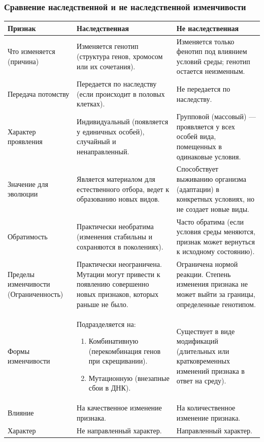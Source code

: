 \documentclass[12pt]{article}
\begin{document}
	\subsubsection{Сравнение наследственной и не наследственной изменчивости}
	\begin{xltabular}{\textwidth}{|X|X|X|}
		\hline
		Признак & Наследственная & Не наследственная\\
		\hline
		Что изменяется (причина) & Изменяется генотип (структура генов, хромосом или их сочетания). & Изменяется только фенотип под влиянием условий среды; генотип остается неизменным.\\
		\hline
		Передача потомству & Передается по наследству (если происходит в половых клетках). & Не передается по наследству.\\
		\hline
		Характер проявления & Индивидуальный (появляется у единичных особей), случайный и ненаправленный. & Групповой (массовый) — проявляется у всех особей вида, помещенных в одинаковые условия.\\
		\hline
		Значение для эволюции & Является материалом для естественного отбора, ведет к образованию новых видов. & Способствует выживанию организма (адаптации) в конкретных условиях, но не создает новые виды.\\
		\hline
		Обратимость	& Практически необратима (изменения стабильны и сохраняются в поколениях). & Часто обратима (если условия среды меняются, признак может вернуться к исходному состоянию).\\
		\hline
		Пределы изменчивости (Ограниченность) & Практически неограничена. Мутации могут привести к появлению совершенно новых признаков, которых раньше не было. & Ограничена нормой реакции. Степень изменения признака не может выйти за границы, определенные генотипом.\\
		\hline
		Формы изменчивости & Подразделяется на: \begin{enumerate}
			\item Комбинативную (перекомбинация генов при скрещивании).
			\item Мутационную (внезапные сбои в ДНК).
		\end{enumerate} & Существует в виде модификаций (длительных или кратковременных изменений признака в ответ на среду).\\
		\hline
		Влияние & На качественное изменение признака. & На количественное изменение признака.\\
		\hline
		Характер & Не направленный характер. & Направленный характер.\\
		\hline
	\end{xltabular}
	
\end{document}
